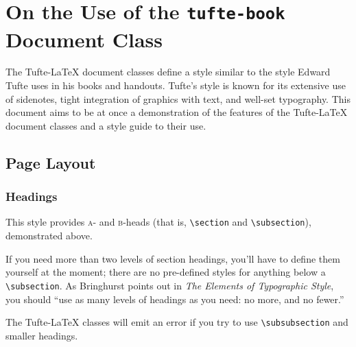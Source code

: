 \documentclass{tufte-book}
\newcommand{\TL}{Tufte-\LaTeX\xspace}
\begin{document}
    
    \chapter[On the Use of the tufte-book Document Class]{On the Use of the \texttt{tufte-book} Document Class}
    \label{ch:tufte-book}
    
    The \TL document classes define a style similar to the
    style Edward Tufte uses in his books and handouts.  Tufte's style is known
    for its extensive use of sidenotes, tight integration of graphics with
    text, and well-set typography.  This document aims to be at once a
    demonstration of the features of the \TL document classes
    and a style guide to their use.
    
    \section{Page Layout}\label{sec:page-layout}
    \subsection{Headings}\label{sec:headings}
    This style provides \textsc{a}- and \textsc{b}-heads (that is,
    \Verb|\section| and \Verb|\subsection|), demonstrated above.
    
    If you need more than two levels of section headings, you'll have to define
    them yourself at the moment; there are no pre-defined styles for anything below
    a \Verb|\subsection|.  As Bringhurst points out in \textit{The Elements of
    Typographic Style},\cite{Bringhurst2005} you should ``use as many levels of
    headings as you need: no more, and no fewer.''
    
    The \TL classes will emit an error if you try to use
    \linebreak\Verb|\subsubsection| and smaller headings.
    
\end{document}

